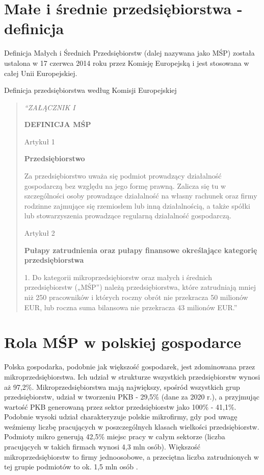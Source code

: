 \documentclass[11pt]{article}
\newenvironment{itquote}
  {\begin{quote} \begin{center}\itshape}
  {\end{center}  \end{quote}   \ignorespacesafterend}
\begin{document}
\section*{Małe i średnie przedsiębiorstwa - definicja}
Definicja Małych i Średnich Przedsiębiorstw (dalej nazywana jako MŚP) została ustalona w 17 czerwca 2014 roku przez Komisję Europejską i jest stosowana w całej Unii Europejskiej.

Definicja przedsiębiorstwa według Komisji Europejskiej \cite{Komisja}

\begin{itquote}
  ``ZAŁĄCZNIK I

  \textbf{DEFINICJA MŚP}

  Artykuł 1

  \textbf{Przedsiębiorstwo}

  Za przedsiębiorstwo uważa się podmiot prowadzący działalność gospodarczą bez względu na jego formę prawną.
  Zalicza się tu w szczególności osoby prowadzące działalność na własny rachunek oraz firmy rodzinne zajmujące się rzemiosłem lub inną działalnością,
  a także spółki lub stowarzyszenia prowadzące regularną działalność gospodarczą.

  Artykuł 2

  \textbf{Pułapy zatrudnienia oraz pułapy finansowe określające kategorię przedsiębiorstwa}

  1. Do kategorii mikroprzedsiębiorstw oraz małych i średnich przedsiębiorstw („MŚP”) należą przedsiębiorstwa,
  które zatrudniają mniej niż 250 pracowników i których roczny obrót nie przekracza 50 milionów EUR, lub roczna
  suma bilansowa nie przekracza 43 milionów EUR.''
\end{itquote}

\section*{Rola MŚP w polskiej gospodarce}

Polska gospodarka, podobnie jak większość gospodarek, jest zdominowana przez mikroprzedsiębiorstwa.
Ich udział w strukturze wszystkich przedsiębiorstw wynosi aż 97,2\%. Mikroprzedsiębiorstwa mają największy, spośród wszystkich
grup przedsiębiorstw, udział w tworzeniu PKB - 29,5\% (dane za 2020 r.), a przyjmując wartość PKB generowaną
przez sektor przedsiębiorstw jako 100\% - 41,1\%. Podobnie wysoki udział charakteryzuje polskie mikrofirmy, gdy pod uwagę weźmiemy liczbę
pracujących w poszczególnych klasach wielkości przedsiębiorstw. Podmioty mikro generują 42,5\% miejsc
pracy w całym sektorze (liczba pracujących w takich firmach wynosi 4,3 mln osób). Większość mikroprzedsiębiorstw to firmy jednoosobowe, a przeciętna liczba
zatrudnionych w tej grupie podmiotów to ok. 1,5 mln osób \cite{RaportPARPoMSP}.
\end{document}
